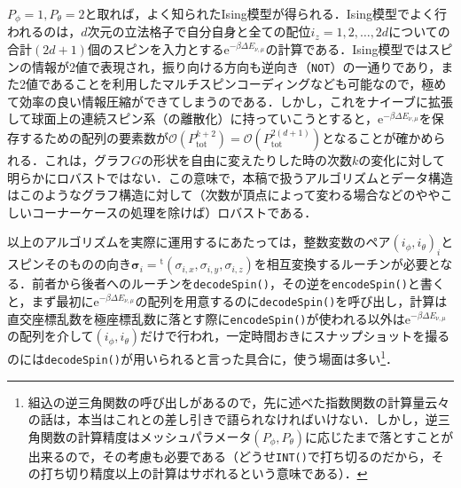 \documentclass[a4,10pt, platex, dvipdfmx]{jsarticle}
\newcommand{\spin}{\bm{\sigma}}
\begin{document}
    $P_{\phi} = 1, P_{\theta} = 2$と取れば，よく知られたIsing模型が得られる．Ising模型でよく行われるのは，$d$次元の立法格子で自分自身と全ての配位$i_{z} = 1, 2, \dots, 2d$についての合計$(2d+1)$個のスピンを入力とする$\mathrm{e}^{-\beta \Delta E_{\nu, \mu}}$の計算である．Ising模型ではスピンの情報が2値で表現され，振り向ける方向も逆向き（\texttt{NOT}）の一通りであり，また2値であることを利用したマルチスピンコーディングなども可能なので，極めて効率の良い情報圧縮ができてしまうのである．しかし，これをナイーブに拡張して球面上の連続スピン系（の離散化）に持っていこうとすると，$\mathrm{e}^{-\beta \Delta E_{\nu, \mu}}$を保存するための配列の要素数が$\mathcal{O}(P_{\mathrm{tot}}^{k + 2}) = \mathcal{O}(P_{\mathrm{tot}}^{2(d + 1)})$となることが確かめられる．これは，グラフ$G$の形状を自由に変えたりした時の次数$k$の変化に対して明らかにロバストではない．この意味で，本稿で扱うアルゴリズムとデータ構造はこのようなグラフ構造に対して（次数が頂点によって変わる場合などのややこしいコーナーケースの処理を除けば）ロバストである．

    以上のアルゴリズムを実際に運用するにあたっては，整数変数のペア$ \left(i_{\phi}, i_{\theta}\right)_{i} $とスピンそのものの向き$\spin_{i} = {}^{\mathrm{t}}\left(\sigma_{i, x}, \sigma_{i, y}, \sigma_{i, z}\right) $を相互変換するルーチンが必要となる．前者から後者へのルーチンを\texttt{decodeSpin()}，その逆を\texttt{encodeSpin()}と書くと，まず最初に$\mathrm{e}^{-\beta \Delta E_{\nu, \mu}}$の配列を用意するのに\texttt{decodeSpin()}を呼び出し，計算は直交座標乱数を極座標乱数に落とす際に\texttt{encodeSpin()}が使われる以外は$\mathrm{e}^{-\beta \Delta E_{\nu, \mu}}$の配列を介して$ \left(i_{\phi}, i_{\theta}\right) $だけで行われ，一定時間おきにスナップショットを撮るのには\texttt{decodeSpin()}が用いられると言った具合に，使う場面は多い\footnote{組込の逆三角関数の呼び出しがあるので，先に述べた指数関数の計算量云々の話は，本当はこれとの差し引きで語られなければいけない．しかし，逆三角関数の計算精度はメッシュパラメータ$\left(P_{\phi}, P_{\theta}\right)$に応じたまで落とすことが出来るので，その考慮も必要である（どうせ\texttt{INT()}で打ち切るのだから，その打ち切り精度以上の計算はサボれるという意味である）．}．

    \printbibliography
\end{document}
